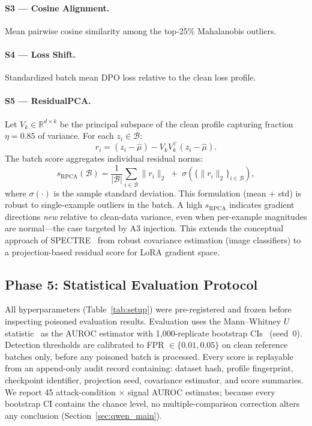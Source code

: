 \documentclass[runningheads]{llncs}
\newcommand{\R}{\mathbb{R}}
\newcommand{\B}{\mathcal{B}}
\begin{document}
\paragraph{S3 --- Cosine Alignment.}
Mean pairwise cosine similarity among the top-25\% Mahalanobis outliers.

\paragraph{S4 --- Loss Shift.}
Standardized batch mean DPO loss relative to the clean loss profile.

\paragraph{S5 --- ResidualPCA.}
Let $V_k \in \R^{d \times k}$ be the principal subspace of the clean profile
capturing fraction $\eta = 0.85$ of variance. For each $z_i \in \B$:
\begin{equation}
  r_i = (z_i - \hat{\mu}) - V_k V_k^\top (z_i - \hat{\mu}).
  \label{eq:rpca_residual}
\end{equation}
The batch score aggregates individual residual norms:
\begin{equation}
  s_{\text{RPCA}}(\B) =
    \frac{1}{|\B|}\sum_{i \in \B}\|r_i\|_2 \;+\;
    \sigma\!\left(\{\|r_i\|_2\}_{i \in \B}\right),
  \label{eq:rpca_score}
\end{equation}
where $\sigma(\cdot)$ is the sample standard deviation. This formulation (mean
$+$ std) is robust to single-example outliers in the batch. A high
$s_{\text{RPCA}}$ indicates gradient directions \emph{new} relative to
clean-data variance, even when per-example magnitudes are normal---the case
targeted by A3 injection. This extends the conceptual approach of
SPECTRE~\cite{hayase2021spectre} from robust covariance estimation (image
classifiers) to a projection-based residual score for LoRA gradient space.

\subsection{Phase 5: Statistical Evaluation Protocol}\label{sec:evalprotocol}

All hyperparameters (Table~\ref{tab:setup}) were pre-registered and frozen
before inspecting poisoned evaluation results. Evaluation uses the
Mann--Whitney $U$ statistic~\cite{mann1947test,bamber1975area} as the AUROC
estimator with 1{,}000-replicate bootstrap CIs~\cite{efron1994introduction}
(seed~0). Detection thresholds are calibrated to FPR $\in \{0.01, 0.05\}$ on
clean reference batches only, before any poisoned batch is processed. Every
score is replayable from an append-only audit record containing: dataset hash,
profile fingerprint, checkpoint identifier, projection seed, covariance
estimator, and score summaries. We report 45 attack-condition $\times$ signal
AUROC estimates; because every bootstrap CI contains the chance level, no
multiple-comparison correction alters any conclusion
(Section~\ref{sec:qwen_main}).
\end{document}
